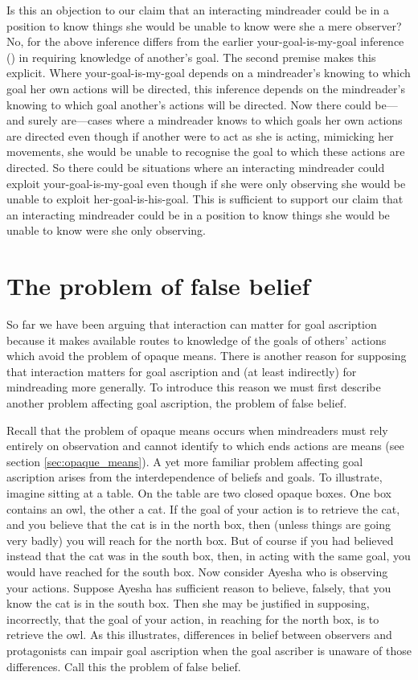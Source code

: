 \documentclass[12pt,\papersize]{extarticle}
\begin{document}
Is this an objection to our claim that an interacting mindreader could be in a position to know things  she would be unable to know were she a mere observer?
No, for the above inference differs from the earlier your-goal-is-my-goal inference () in requiring knowledge of another's goal. 
The second premise makes this explicit.
Where your-goal-is-my-goal depends on a mindreader's knowing to which goal her own actions will be directed, this inference depends on the mindreader's knowing to which goal another's actions will be directed. 
Now there could be---and surely are---cases where a mindreader knows to which goals her own actions are directed even though if another were to act as she is acting, mimicking her movements, she would be unable to recognise the goal to which these actions are directed.
So there could be situations where an interacting mindreader could exploit your-goal-is-my-goal even though if she were only observing she would be unable to exploit her-goal-is-his-goal.  
This is sufficient to support our claim that an interacting mindreader could be in a position to know things  she would be unable to know were she only observing. 





\section{The problem of false belief}
\label{sec:false_belief}
So far we have been arguing that interaction can matter for goal ascription
because it  makes available routes to knowledge of the goals of others' actions
which avoid the problem of opaque means.
There is another reason for supposing that interaction matters for goal ascription and (at least indirectly) for mindreading more generally.
To introduce this reason we must first describe another problem affecting goal ascription, the problem of false belief.

Recall that the problem of opaque means occurs when mindreaders  must rely entirely on observation and cannot identify to which ends actions are means 
(see section \vref{sec:opaque_means}).
A yet more familiar problem affecting goal ascription 
arises from the interdependence of beliefs and goals.
To illustrate, 
imagine sitting at a table.
On the table are two closed opaque boxes.
One box contains an owl, the other a cat.
If the goal of your action is to retrieve the cat, 
and you believe that the cat is in the north box,
then 
(unless things are going very badly) 
you will reach for the north box.
But of course if you had believed instead that the cat was in the south box,
then, in acting with the same goal, you would have reached for the south box.
Now consider Ayesha who is observing your actions.
Suppose Ayesha has sufficient reason to believe, falsely, that you know the cat is in the south box.
Then she may be justified in supposing, incorrectly, that 
the goal of your action, in reaching for the north box,
is to retrieve the owl.
As this illustrates,
differences in belief between observers and protagonists can 
impair goal ascription
when the goal ascriber is unaware of those differences.
Call this the problem of false belief.
\end{document}
